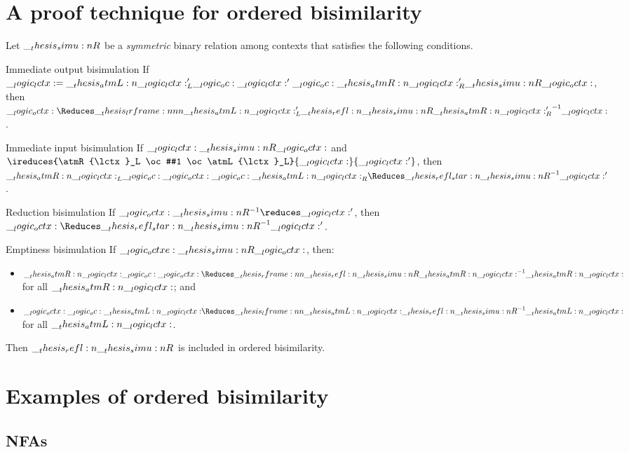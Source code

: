 \section{A proof technique for ordered bisimilarity}

\begin{theorem}\label{thm:ord-bisim-technique}
  Let $\__thesis_simu:n {R}$ be a \emph{symmetric} binary relation among contexts that satisfies the following conditions.
  \begin{thmdescription}
  \item[Immediate output bisimulation]
    If $\__logic_lctx: = \__thesis_atmL:n {\__logic_lctx:}'_L \__logic_oc: \__logic_lctx:' \__logic_oc: \__thesis_atmR:n {\__logic_lctx:}'_R \__thesis_simu:n {R} \__logic_octx:$, then $\octx \Reduces\lrframe{\atmL{\lctx}'_L}{\refl{\simu{R}}}{\atmR{\lctx}'_R}^{-1} \lctx$.
  \item[Immediate input bisimulation]
    If $\__logic_lctx: \__thesis_simu:n {R} \__logic_octx:$ and $\ireduces{\atmR{\lctx}_L \oc #1 \oc \atmL{\lctx}_L}{\lctx}{\lctx'}$, then $\atmR{\lctx}_L \oc \octx \oc \atmL{\lctx}_R \Reduces\refl*{\simu{R}}^{-1} \lctx'$.
  \item[Reduction bisimulation]
    If $\octx \simu{R}^{-1}\reduces \lctx'$, then $\octx \Reduces\refl*{\simu{R}}^{-1} \lctx'$.
  \item[Emptiness bisimulation]
    If $\__logic_octxe: \__thesis_simu:n {R} \__logic_octx:$, then:
    \begin{itemize}
    \item $\atmR{\lctx} \oc \octx \Reduces\rframe{\refl{\simu{R}}}{\atmR{\lctx}}^{-1} \atmR{\lctx}$ for all $\__thesis_atmR:n {\__logic_lctx:}$; and
    \item $\octx \oc \atmL{\lctx} \Reduces\lframe{\atmL{\lctx}}{\refl{\simu{R}}}^{-1} \atmL{\lctx}$ for all $\__thesis_atmL:n {\__logic_lctx:}$.
    \end{itemize}
  \end{thmdescription}
  Then $\refl{\simu{R}}$ is included in ordered bisimilarity.
\end{theorem}


\section{Examples of ordered bisimilarity}

\subsection{\Aclp*{NFA}}

